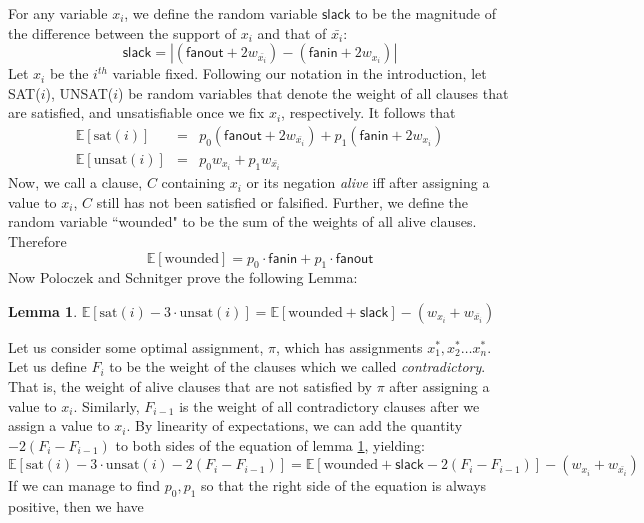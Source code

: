 \documentclass[11pt,letter]{article}
\newtheorem{lemma}[theorem]{Lemma}
\numberwithin{theorem}{section}
\begin{document}
For any variable $x_i$, we define the random variable $\mathsf{slack}$ to be the magnitude of the difference between the support of $x_i$ and that of $\bar{x_i}$:
\begin{equation}
\mathsf{slack} = |(\mathsf{fanout} + 2w_{\bar{x_i}}) -(\mathsf{fanin} + 2w_{x_i})|
\end{equation}
Let $x_i$ be the $i^{th}$ variable fixed. Following our notation in the introduction, let SAT($i$), UNSAT($i$) be random variables that denote the weight of all clauses that are satisfied, and unsatisfiable once we fix $x_i$, respectively. It follows that
\begin{eqnarray}
\mathbb{E}[\textrm{sat}(i)] &=& p_0(\mathsf{fanout} + 2w_{\bar{x_i}}) + p_1(\mathsf{fanin} + 2w_{x_i})\\
\mathbb{E}[\textrm{unsat}(i)] &=& p_0w_{x_i} + p_1w_{\bar{x_i}}
\end{eqnarray}
Now, we call a clause, $C$ containing $x_i$ or its negation \textit{alive} iff after assigning a value to $x_i$, $C$ still has not been satisfied or falsified. Further, we define the random variable ``wounded" to be the sum of the weights of all alive clauses. Therefore
\begin{equation}
\mathbb{E}[\textrm{wounded}] = p_0 \cdot \mathsf{fanin} + p_1 \cdot \mathsf{fanout}
\end{equation}
Now Poloczek and Schnitger prove the following Lemma:
\begin{lemma} \label{L:2}
$\mathbb{E}[\textrm{sat}(i) - 3\cdot\textrm{unsat}(i)] = \mathbb{E}[\textrm{wounded} + \mathsf{slack}] - (w_{x_i} + w_{\bar{x_i}})$
\end{lemma}
Let us consider some optimal assignment, $\pi$, which has assignments $x_1^*, x_2^* \ldots x_n^*$. Let us define $F_i$ to be the weight of the clauses which we called \emph{contradictory}. That is, the weight of alive clauses that are not satisfied by $\pi$ after assigning a value to $x_i$. Similarly, $F_{i-1}$ is the weight of all contradictory clauses  after we assign a value to $x_i$. By linearity of expectations, we can add the quantity $-2(F_{i}-F_{i-1})$ to both sides of the equation of lemma \ref{L:2}, yielding:
\begin{equation}
\mathbb{E}[\textrm{sat}(i) - 3\cdot\textrm{unsat}(i) - 2(F_{i}-F_{i-1})] = \mathbb{E}[\textrm{wounded} + \mathsf{slack} - 2(F_{i}-F_{i-1})] - (w_{x_i} + w_{\bar{x_i}})
\end{equation}
If we can manage to find $p_0,p_1$ so that the right side of the equation is always positive, then we have
\end{document}
